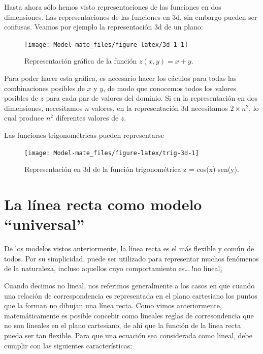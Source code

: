 \documentclass[
]{book}
\begin{document}
Hasta ahora sólo hemos visto representaciones de las funciones en dos dimensiones. Las representaciones de las funciones en 3d, sin embargo pueden ser confusas. Veamos por ejemplo la representación 3d de un plano:

\begin{figure}

{\centering \texttt{[image: Model-mate\_files/figure-latex/3d-1-1]} 

}

\caption{Representación gráfica de la función $z(x, y) = x + y$.}\label{fig:3d-1}
\end{figure}

Para poder hacer esta gráfica, es necesario hacer los cáculos para todas las combinaciones posibles de \(x\) y \(y\), de modo que conocemos todos los valores posibles de \(z\) para cada par de valores del dominio. Si en la representación en dos dimensiones, necesitamos \(n\) valores, en la representación 3d necesitamos \(2 \times n^2\), lo cual produce \(n^2\) diferentes valores de \(z\).

Las funciones trigonométricas pueden representarse

\begin{figure}

{\centering \texttt{[image: Model-mate\_files/figure-latex/trig-3d-1]} 

}

\caption{Representación en 3d de la función trigonométrica z = cos(x) sen(y).}\label{fig:trig-3d}
\end{figure}

\hypertarget{la-luxednea-recta-como-modelo-universal}{%
\section{La línea recta como modelo ``universal''}\label{la-luxednea-recta-como-modelo-universal}}

De los modelos vistos anteriormente, la línea recta es el más flexible y común de todos. Por su simplicidad, puede ser utilizado para representar muchos fenómenos de la naturaleza, incluso aquellos cuyo comportamiento es\ldots{} !no lineal¡

Cuando decimos no lineal, nos referimos generalmente a los casos en que cuando una relación de correspondencia es representada en el plano cartesiano los puntos que la forman no dibujan una línea recta. Como vimos anteriormente, matemáticamente es posible concebir como lineales reglas de corresondencia que no son lineales en el plano cartesiano, de ahí que la función de la línea recta pueda ser tan flexible. Para que una ecuación sea considerada como lineal, debe cumplir con las siguientes características:
\end{document}

